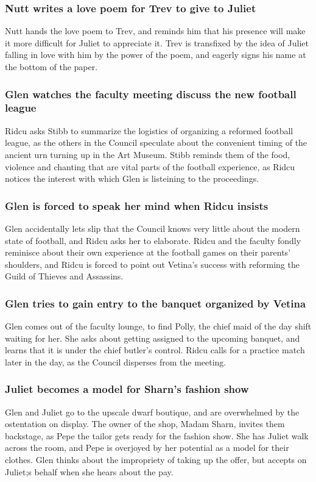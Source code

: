 \subsubsection{\Gls{Nutt} writes a love poem for \Gls{Trev} to give to \Gls{Juliet}}
\Gls{Nutt} hands the love poem to \Gls{Trev}, and reminds him that his presence will make it more
difficult for \Gls{Juliet} to appreciate it. \Gls{Trev} is transfixed by the idea of \Gls{Juliet}
falling in love with him by the power of the poem, and eagerly signs his name at the bottom of the
paper.

\subsubsection{\Gls{Glen} watches the faculty meeting discuss the new football league}
\Gls{Ridcu} asks \Gls{Stibb} to summarize the logistics of organizing a reformed football league,
as the others in the Council speculate about the convenient timing of the ancient urn turning up in
the Art Museum. \Gls{Stibb} reminds them of the food, violence and chanting that are vital parts of
the football experience, as \Gls{Ridcu} notices the interest with which \Gls{Glen} is listeining
to the proceedings.

\subsubsection{\Gls{Glen} is forced to speak her mind when \Gls{Ridcu} insists}
\Gls{Glen} accidentally lets slip that the Council knows very little about the modern state of
football, and \Gls{Ridcu} asks her to elaborate. \Gls{Ridcu} and the faculty fondly reminisce
about their own experience at the football games on their parents' shoulders, and \Gls{Ridcu} is
forced to point out \Gls{Vetina}'s success with reforming the Guild of Thieves and Assassins.

\subsubsection{\Gls{Glen} tries to gain entry to the banquet organized by \Gls{Vetina}}
\Gls{Glen} comes out of the faculty lounge, to find \Gls{Polly}, the chief maid of the day shift
waiting for her. She asks about getting assigned to the upcoming banquet, and learns that it is
under the chief butler's control. \Gls{Ridcu} calls for a practice match later in the day, as the
Council disperses from the meeting.

\subsubsection{\Gls{Juliet} becomes a model for \Gls{Sharn}'s fashion show}
\Gls{Glen} and \Gls{Juliet} go to the upscale dwarf boutique, and are overwhelmed by the ostentation
on display. The owner of the shop, Madam \Gls{Sharn}, invites them backstage, as \Gls{Pepe} the
tailor gets ready for the fashion show. She has \Gls{Juliet} walk across the room, and \Gls{Pepe} is
overjoyed by her potential as a model for their clothes. \Gls{Glen} thinks about the impropriety of
taking up the offer, but accepts on \Gls{Juliet};s behalf when she hears about the pay.

